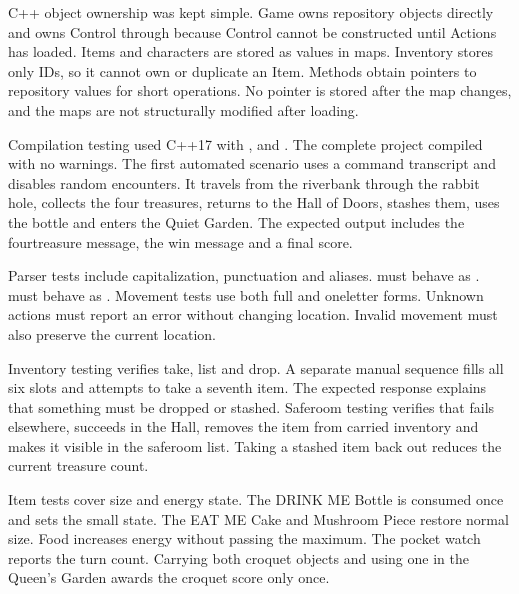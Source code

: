 \documentclass[letterpaper,10pt,english]{sphinxmanual}
\begin{document}
\sphinxAtStartPar
C++ object ownership was kept simple. Game owns repository objects directly and
owns Control through  because Control cannot be constructed
until Actions has loaded. Items and characters are stored as values in maps.
Inventory stores only IDs, so it cannot own or duplicate an Item. Methods obtain
pointers to repository values for short operations. No pointer is stored after
the map changes, and the maps are not structurally modified after loading.

\sphinxAtStartPar
Compilation testing used C++17 with ,  and .
The complete project compiled with no warnings. The first automated scenario
uses a command transcript and disables random encounters. It travels from the
riverbank through the rabbit hole, collects the four treasures, returns to the
Hall of Doors, stashes them, uses the bottle and enters the Quiet Garden. The
expected output includes the four\sphinxhyphen{}treasure message, the win message and a final
score.

\sphinxAtStartPar
Parser tests include capitalization, punctuation and aliases.  must
behave as .  must behave as . Movement tests use
both full and one\sphinxhyphen{}letter forms. Unknown actions must report an error without
changing location. Invalid movement must also preserve the current location.

\sphinxAtStartPar
Inventory testing verifies take, list and drop. A separate manual sequence fills
all six slots and attempts to take a seventh item. The expected response explains
that something must be dropped or stashed. Safe\sphinxhyphen{}room testing verifies that
 fails elsewhere, succeeds in the Hall, removes the item from carried
inventory and makes it visible in the safe\sphinxhyphen{}room list. Taking a stashed item back
out reduces the current treasure count.

\sphinxAtStartPar
Item tests cover size and energy state. The DRINK ME Bottle is consumed once and
sets the small state. The EAT ME Cake and Mushroom Piece restore normal size.
Food increases energy without passing the maximum. The pocket watch reports the
turn count. Carrying both croquet objects and using one in the Queen’s Garden
awards the croquet score only once.
\end{document}
